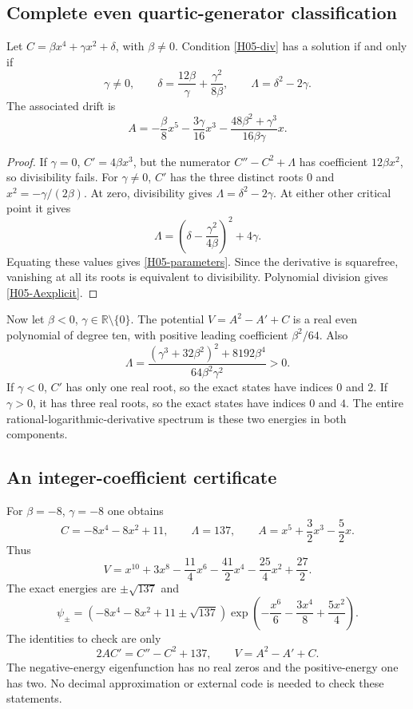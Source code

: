 \documentclass[11pt,a4paper]{article}
\theoremstyle{definition}\newtheorem{definition}[theorem]{Definition}
\theoremstyle{remark}\newtheorem{remark}[theorem]{Remark}
\newcommand{\R}{\mathbb R}\newcommand{\C}{\mathbb C}\newcommand{\N}{\mathbb N}
\numberwithin{equation}{section}
\begin{document}
\subsection{Complete even quartic-generator classification}\label{H05-sec-3}
Let $C=\beta x^4+\gamma x^2+\delta$, with $\beta\ne0$. Condition \eqref{H05-div} has a solution if and only if
\begin{equation}\label{H05-parameters}
\gamma\ne0,\qquad
\delta=\frac{12\beta}{\gamma}+\frac{\gamma^2}{8\beta},\qquad
\Lambda=\delta^2-2\gamma.
\end{equation}
The associated drift is
\begin{equation}\label{H05-Aexplicit}
A=-\frac\beta8x^5-\frac{3\gamma}{16}x^3
-\frac{48\beta^2+\gamma^3}{16\beta\gamma}x.
\end{equation}
\begin{proof}
If $\gamma=0$, $C'=4\beta x^3$, but the numerator $C''-C^2+\Lambda$ has coefficient $12\beta x^2$, so divisibility fails. For $\gamma\ne0$, $C'$ has the three distinct roots $0$ and $x^2=-\gamma/(2\beta)$. At zero, divisibility gives $\Lambda=\delta^2-2\gamma$. At either other critical point it gives
\[\Lambda=\left(\delta-\frac{\gamma^2}{4\beta}\right)^2+4\gamma.\]
Equating these values gives \eqref{H05-parameters}. Since the derivative is squarefree, vanishing at all its roots is equivalent to divisibility. Polynomial division gives \eqref{H05-Aexplicit}.
\end{proof}
Now let $\beta<0$, $\gamma\in\R\setminus\{0\}$. The potential $V=A^2-A'+C$ is a real even polynomial of degree ten, with positive leading coefficient $\beta^2/64$. Also
\[\Lambda=
\frac{(\gamma^3+32\beta^2)^2+8192\beta^4}{64\beta^2\gamma^2}>0.
\]
If $\gamma<0$, $C'$ has only one real root, so the exact states have indices $0$ and $2$. If $\gamma>0$, it has three real roots, so the exact states have indices $0$ and $4$. The entire rational-logarithmic-derivative spectrum is these two energies in both components.
\subsection{An integer-coefficient certificate}\label{H05-sec-4}
For $\beta=-8$, $\gamma=-8$ one obtains
\[C=-8x^4-8x^2+11,\qquad\Lambda=137,\qquad
A=x^5+\frac32x^3-\frac52x.
\]
Thus
\[V=x^{10}+3x^8-\frac{11}{4}x^6
-\frac{41}{2}x^4-\frac{25}{4}x^2+\frac{27}{2}.
\]
The exact energies are $\pm\sqrt{137}$ and
\[\psi_\pm=(-8x^4-8x^2+11\pm\sqrt{137})
\exp\left(-\frac{x^6}{6}-\frac{3x^4}{8}+\frac{5x^2}{4}\right).
\]
The identities to check are only
\[2AC'=C''-C^2+137,\qquad V=A^2-A'+C.
\]
The negative-energy eigenfunction has no real zeros and the positive-energy one has two. No decimal approximation or external code is needed to check these statements.
\end{document}
